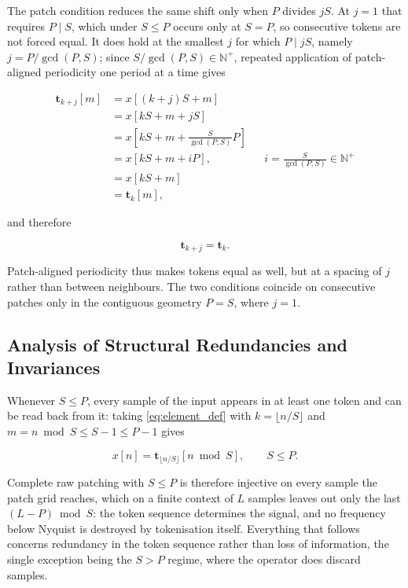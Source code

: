 The patch condition reduces the same shift only when $P$ divides $jS$. At $j=1$ that requires $P \mid S$, which under $S\le P$ occurs only at $S=P$, so consecutive tokens are not forced equal. It does hold at the smallest $j$ for which $P \mid jS$, namely $j = P/\gcd(P,S)$; since $S/\gcd(P,S)\in\mathbb{N}^{+}$, repeated application of patch-aligned periodicity one period at a time gives

\begin{equation*}
\begin{aligned}
\mathbf{t}_{k+j}[m]
&=
x[(k+j)S+m]
\\
&=
x[kS+m+jS]
\\
&=
x\!\left[kS+m+\frac{S}{\gcd(P,S)}P\right]
\\
&=
x[kS+m+iP],
&& i=\tfrac{S}{\gcd(P,S)}\in\mathbb{N}^{+}
\\
&=
x[kS+m]
\\
&=
\mathbf{t}_k[m],
\end{aligned}
\end{equation*}

and therefore

\begin{equation}
\label{eq:token_period_P}
\mathbf{t}_{k+j}
=
\mathbf{t}_k.
\end{equation}

Patch-aligned periodicity thus makes tokens equal as well, but at a spacing of $j$ rather than between neighbours. The two conditions coincide on consecutive patches only in the contiguous geometry $P=S$, where $j=1$.

\subsection{Analysis of Structural Redundancies and Invariances}

Whenever $S\le P$, every sample of the input appears in at least one token and can be read back from it: taking \autoref{eq:element_def} with $k=\lfloor n/S\rfloor$ and $m = n \bmod S \le S-1 \le P-1$ gives

\begin{equation}
\label{eq:reconstruction}
x[n]
=
\mathbf{t}_{\lfloor n/S\rfloor}\!\left[n \bmod S\right],
\qquad
S\le P.
\end{equation}

Complete raw patching with $S\le P$ is therefore injective on every sample the patch grid reaches, which on a finite context of $L$ samples leaves out only the last $(L-P)\bmod S$: the token sequence determines the signal, and no frequency below Nyquist is destroyed by tokenisation itself. Everything that follows concerns redundancy in the token sequence rather than loss of information, the single exception being the $S>P$ regime, where the operator does discard samples.

